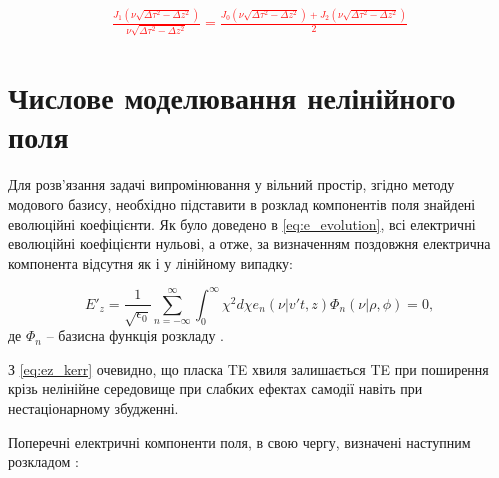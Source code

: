 \textcolor{red} { \begin{equation*} \begin{aligned}
\frac{J_1 \left( \nu \sqrt{\Delta \tau^2 - \Delta z^2} \right)}
{\nu \sqrt{\Delta \tau^2 - \Delta z^2}} =
\frac{J_0 \left( \nu \sqrt{\Delta \tau^2 - \Delta z^2} \right) +
J_2 \left( \nu \sqrt{\Delta \tau^2 - \Delta z^2} \right)}{2}
\end{aligned} \end{equation*} }


\section{Числове моделювання нелінійного поля}

Для розв'язання задачі випромінювання у вільний простір, згідно методу 
модового базису, необхідно підставити в розклад компонентів поля знайдені 
еволюційні коефіцієнти. Як було доведено в \eqref{eq:e_evolution}, всі електричні 
еволюційні коефіцієнти нульові, а отже, за визначенням поздовжня електрична
компонента відсутня як і у лінійному випадку:

\begin{equation} \label{eq:ez_kerr}
E'_z = \frac{1}{\sqrt{\epsilon_0}} \sum_{n=-\infty}^{\infty}
\int_0^\infty \chi^2 d \chi e_n (\nu | v't, z) \Phi_n (\nu | \rho, \phi) = 0,
\end{equation}
%
де $ \Phi_n $ -- базисна функція розкладу \cite{imp:Tretyakov2010}.

З \eqref{eq:ez_kerr} очевидно, що пласка TE хвиля залишається TE при поширення 
крізь нелінійне середовище при слабких ефектах самодії навіть при 
нестаціонарному збудженні.

Поперечні електричні компоненти поля, в свою чергу, визначені наступним 
розкладом \cite{imp:Dumin2000}:

